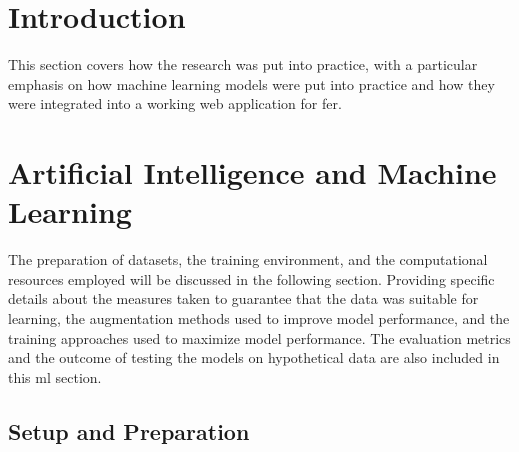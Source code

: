 \section{Introduction}
This section covers how the research was put into practice, with a particular emphasis on how machine learning models were put into practice and how they were integrated into a working web application for \gls{fer}.
\section{Artificial Intelligence and Machine Learning}
The preparation of datasets, the training environment, and the computational resources employed will be discussed in the following section.
Providing specific details about the measures taken to guarantee that the data was suitable for learning, the augmentation methods used to improve model performance, and the training approaches used to maximize model performance.
The evaluation metrics and the outcome of testing the models on hypothetical data are also included in this \gls{ml} section.
\subsection{Setup and Preparation}
